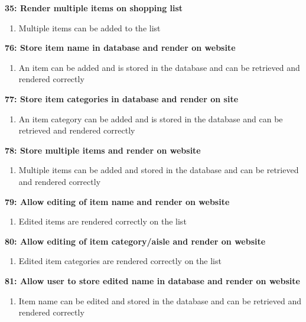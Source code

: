\documentclass[10pt,onecolumn]{witseiepaper}
\begin{document}
\textbf{35: Render multiple items on shopping list}

\begin{enumerate}
	\item Multiple items can be added to the list
\end{enumerate}

\textbf{76: Store item name in database and render on website}

\begin{enumerate}
	\item An item can be added and is stored in the database and can be retrieved and rendered correctly
\end{enumerate}

\textbf{77: Store item categories in database and render on site}

\begin{enumerate}
	\item An item category can be added and is stored in the database and can be retrieved and rendered correctly
\end{enumerate}

\textbf{78: Store multiple items and render on website}

\begin{enumerate}
	\item Multiple items can be added and stored in the database and can be retrieved and rendered correctly
\end{enumerate}

\textbf{79: Allow editing of item name and render on website}

\begin{enumerate}
	\item Edited items are rendered correctly on the list
\end{enumerate}

\textbf{80: Allow editing of item category/aisle and render on website}

\begin{enumerate}
	\item Edited item categories are rendered correctly on the list
\end{enumerate}

\textbf{81: Allow user to store edited name in database and render on website}

\begin{enumerate}
	\item Item name can be edited and stored in the database and can be retrieved and rendered correctly
\end{enumerate}
\end{document}
